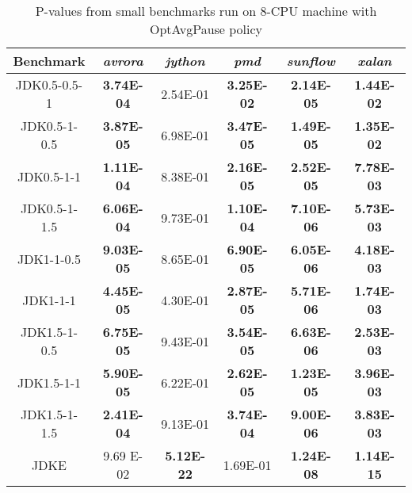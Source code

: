\begin{table} [H]
\caption{P-values from small benchmarks run on 8-CPU  machine with OptAvgPause
policy}
\begin{tabular}[H]{|c|c|c|c|c|c|}
\hline
Benchmark & \emph{avrora} & \emph{jython} & \emph{pmd} & \emph{sunflow}
& \emph{xalan}\tabularnewline \hline

JDK0.5-0.5-1 & \textbf{3.74E-04} & 2.54E-01 & \textbf{3.25E-02} & \textbf{2.14E-05} &
\textbf{1.44E-02}\tabularnewline \hline

JDK0.5-1-0.5 & \textbf{3.87E-05} & 6.98E-01 &\textbf{ 3.47E-05} & \textbf{1.49E-05} &
\textbf{1.35E-02}\tabularnewline \hline

JDK0.5-1-1 & \textbf{1.11E-04 }& 8.38E-01 &\textbf{ 2.16E-05} & \textbf{2.52E-05} &
\textbf{7.78E-03}\tabularnewline \hline

JDK0.5-1-1.5 & \textbf{6.06E-04 }& 9.73E-01 & \textbf{1.10E-04} &\textbf{ 7.10E-06 }&
\textbf{5.73E-03}\tabularnewline \hline

JDK1-1-0.5 & \textbf{9.03E-05} & 8.65E-01 &\textbf{ 6.90E-05} & \textbf{6.05E-06} &
\textbf{4.18E-03}\tabularnewline \hline

JDK1-1-1 &\textbf{ 4.45E-05} & 4.30E-01 &\textbf{ 2.87E-05} &\textbf{ 5.71E-06} &
\textbf{1.74E-03}\tabularnewline \hline

JDK1.5-1-0.5 &\textbf{ 6.75E-05} & 9.43E-01 &\textbf{ 3.54E-05} & \textbf{6.63E-06} &
\textbf{2.53E-03}\tabularnewline \hline

JDK1.5-1-1 &\textbf{ 5.90E-05} & 6.22E-01 & \textbf{2.62E-05} &\textbf{ 1.23E-05} &
\textbf{3.96E-03}\tabularnewline \hline

JDK1.5-1-1.5 &\textbf{ 2.41E-04 }& 9.13E-01 & \textbf{3.74E-04} &\textbf{ 9.00E-06} &
\textbf{3.83E-03}\tabularnewline \hline

JDKE & 9.69 E-02 &\textbf{ 5.12E-22} & 1.69E-01 &\textbf{ 1.24E-08} &
\textbf{1.14E-15}\tabularnewline \hline
\end{tabular}
\end{table}
